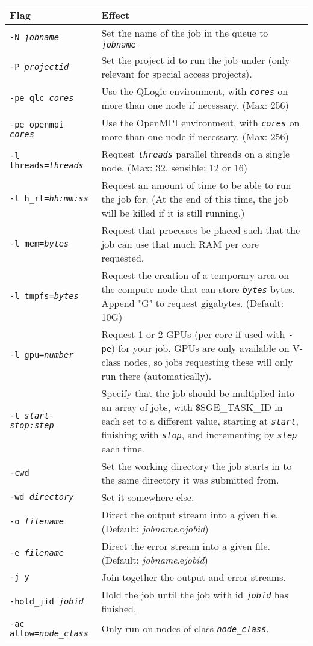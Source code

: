 \documentclass[landscape,a4paper]{article}
\renewcommand{\th}[1]{\textbf{#1}}
\newcommand{\code}[1]{\texttt{#1}}
\newcommand{\codeit}[1]{\texttt{\color{SchemeColour}\emph{#1}}}
\begin{document}
\begin{multicols}{3}
~

{\small \centering
\begin{tabular}{p{2.5cm}p{5cm}}
\hline
\th{Flag} & \th{Effect}\\
\hline
\code{-N }\codeit{jobname} &
Set the name of the job in the queue to \codeit{jobname}
\\
\code{-P }\codeit{projectid} &
Set the project id to run the job under (only relevant for special access projects).
\\
\code{-pe qlc }\codeit{cores} & 
Use the QLogic environment, with \codeit{cores} on more than one node if necessary. (Max: 256)
\\
\code{-pe openmpi }\codeit{cores} &
Use the OpenMPI environment, with \codeit{cores} on more than one node if necessary. (Max: 256)
\\
\code{-l threads=}\codeit{threads} &
Request \codeit{threads} parallel threads on a single node. (Max: 32, sensible: 12 or 16)
\\
\code{-l h\_rt=}\codeit{hh:mm:ss} & 
Request an amount of time to be able to run the job for. (At the end of this time, the job will be killed if it is still running.)
\\
\code{-l mem=}\codeit{bytes} & 
Request that processes be placed such that the job can use that much RAM per core requested.
\\
\code{-l tmpfs=}\codeit{bytes} & 
Request the creation of a temporary area on the compute node that can store \codeit{bytes} bytes. Append "G" to request gigabytes. (Default: 10G)
\\
\code{-l gpu=}\codeit{number} &
Request 1 or 2 GPUs (per core if used with \code{-pe}) for your job. GPUs are only available on V-class nodes, so jobs requesting these will only run there (automatically).
\\ 
\code{-t }\codeit{start-stop:step} & 
Specify that the job should be multiplied into an array of jobs, with \$SGE\_TASK\_ID in each set to a different value, starting at \codeit{start}, finishing with \codeit{stop}, and incrementing by \codeit{step} each time.
\\
\code{-cwd} & 
Set the working directory the job starts in to the same directory it was submitted from.
\\
\code{-wd }\codeit{directory} & 
Set it somewhere else.
\\
\code{-o }\codeit{filename} & 
Direct the output stream into a given file. (Default: \textit{jobname}.o\textit{jobid})
\\
\code{-e }\codeit{filename} & 
Direct the error stream into a given file. (Default: \textit{jobname}.e\textit{jobid})
\\
\code{-j y} & 
Join together the output and error streams.
\\
\code{-hold\_jid }\codeit{jobid} & 
Hold the job until the job with id \codeit{jobid} has finished.
\\
\code{-ac allow=}\codeit{node\_class} & 
Only run on nodes of class \codeit{node\_class}.
\\
\hline
\end{tabular}
}



\end{multicols}
\end{document}
